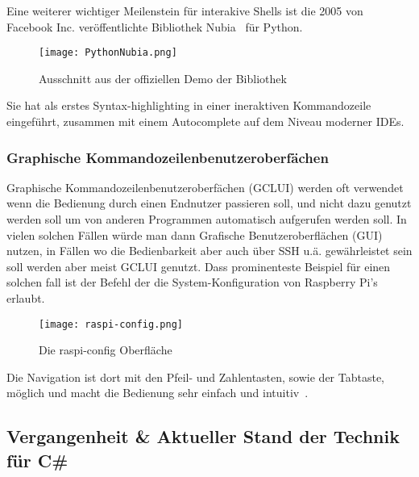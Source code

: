  Eine weiterer wichtiger Meilenstein für interakive Shells ist die 2005 von Facebook Inc. veröffentlichte Bibliothek Nubia~\cite{NubiaReleaseBlogPost} für Python.
 \begin{figure}[H]
  \texttt{[image: PythonNubia.png]}
  \caption{Ausschnitt aus der offiziellen Demo der Bibliothek}
  \label{fig:PythonNubia}
 \end{figure}
 Sie hat als erstes Syntax-highlighting in einer ineraktiven Kommandozeile eingeführt, zusammen mit einem Autocomplete auf dem Niveau moderner IDEs.
 \subsubsection{Graphische Kommandozeilenbenutzeroberfächen}
 Graphische Kommandozeilenbenutzeroberfächen (GCLUI) werden oft verwendet wenn die Bedienung durch einen Endnutzer passieren soll,
 und nicht dazu genutzt werden soll um von anderen Programmen automatisch aufgerufen werden soll.
 In vielen solchen Fällen würde man dann Grafische Benutzeroberflächen (GUI) nutzen, in Fällen wo die Bedienbarkeit aber auch über SSH u.ä. gewährleistet sein soll werden aber meist GCLUI genutzt.
 Dass prominenteste Beispiel für einen solchen fall ist der  Befehl der die System-Konfiguration von Raspberry Pi's erlaubt.
 \begin{figure}[H]
\texttt{[image: raspi-config.png]}
\caption{Die raspi-config Oberfläche}
\label{fig:raspi-config}
 \end{figure}
 Die Navigation ist dort mit den Pfeil- und Zahlentasten, sowie der Tabtaste, möglich und macht die Bedienung sehr einfach und intuitiv~\cite{RaspiConfigOfficialInfo}.
 \subsection{Vergangenheit \& Aktueller Stand der Technik für C\#}\label{subsec:CurrentState}
